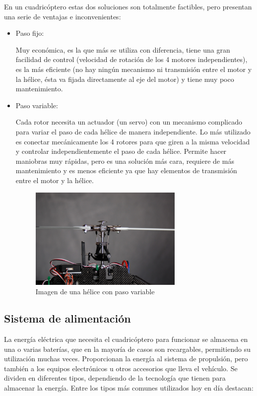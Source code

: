 \documentclass[12pt,twoside]{article}
\begin{document}
		En un cuadricóptero estas dos soluciones son totalmente factibles, pero presentan una serie de ventajas e inconvenientes:

		\begin{itemize}
			\item Paso fijo: 
			
			Muy económica, es la que más se utiliza con diferencia, tiene una gran facilidad de control (velocidad de rotación de los 4 motores independientes), es la más eficiente (no hay ningún mecanismo ni transmisión entre el motor y la hélice, ésta va fijada directamente al eje del motor) y tiene muy poco mantenimiento.
			
			\item Paso variable: 
			
			Cada rotor necesita un actuador (un servo) con un mecanismo complicado para variar el paso de cada hélice de manera independiente. Lo más utilizado es conectar mecánicamente los 4 rotores para que giren a la misma velocidad y controlar independientemente el paso de cada hélice. Permite hacer maniobras muy rápidas, pero es una solución más cara, requiere de más mantenimiento y es menos eficiente ya que hay elementos de transmisión entre el motor y la hélice.
			
			\begin{figure}
			\centering
			\includegraphics[width=0.7\textwidth]{Imatges/Funcionament/paso_variable.png}
			\caption{Imagen de una hélice con paso variable}
			\label{fig:paso_variable}
			\end{figure}
		\end{itemize}

		\subsection{Sistema de alimentación}\label{subsec:alimentacion}
		La energía eléctrica que necesita el cuadricóptero para funcionar se almacena en una o varias baterías, que en la mayoría de casos son recargables, permitiendo su utilización muchas veces. 
Proporcionan la energía al sistema de propulsión, pero también a los equipos electrónicos u otros accesorios que lleva el vehículo.
Se dividen en diferentes tipos, dependiendo de la tecnología que tienen para almacenar la energía. Entre los tipos más comunes utilizados hoy en día destacan: 
\end{document}
